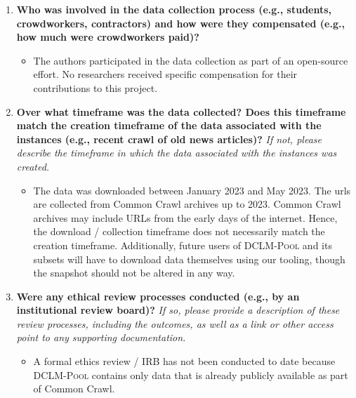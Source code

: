 \documentclass{article}
\newcommand{\rawpool}{\textsc{DCLM-Pool}\xspace}
\newcommand{\commoncrawl}{Common Crawl\xspace}
\begin{document}
\begin{enumerate}[label=Q\arabic*, resume]
\begin{itemize}
\item \rawpool is not a probabilistic sample. As described in Q7, \rawpool contains all data from \commoncrawl before 2023. \commoncrawl is a sample of the Web, and we refer to \commoncrawl documentation for details of their sampling process. Our competition pools for the various scales however are fixed subsets from \rawpool, formed by randomly subsetting \rawpool / Common Crawl paths.
\end{itemize}

\item \textbf{Who was involved in the data collection process (e.g., students, crowdworkers, contractors) and how were they compensated (e.g., how much were crowdworkers paid)?}

\begin{itemize}
\item The authors participated in the data collection as part of an open-source effort. No researchers received specific compensation for their contributions to this project.
\end{itemize}

\item \textbf{Over what timeframe was the data collected? Does this timeframe match the creation timeframe of the data associated with the instances (e.g., recent crawl of old news articles)?} \textit{If not, please describe the timeframe in which the data associated with the instances was created.}

\begin{itemize}
\item The data was downloaded between January 2023 and May 2023. The urls are collected from \commoncrawl archives up to 2023. \commoncrawl archives may include URLs from the early days of the internet. Hence, the download / collection timeframe does not necessarily match the creation timeframe. Additionally, future users of \rawpool and its subsets will have to download data themselves using our tooling, though the snapshot should not be altered in any way.
\end{itemize}

\item \textbf{Were any ethical review processes conducted (e.g., by an institutional review board)?} \textit{If so, please provide a description of these review processes, including the outcomes, as well as a link or other access point to any supporting documentation.}

\begin{itemize}
\item A formal ethics review / IRB has not been conducted to date because \rawpool contains only data that is already publicly available as part of \commoncrawl.
\end{itemize}


\end{enumerate}
\end{document}
